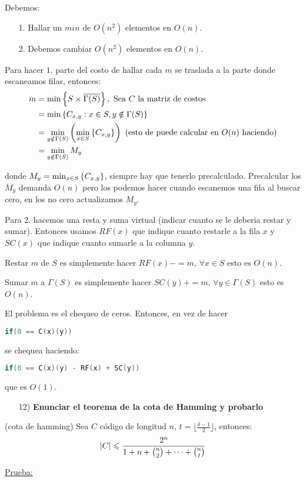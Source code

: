 \documentclass[12pt,a4paper]{article}
\begin{document}
Debemos:
\begin{itemize}
    \item [1.] Hallar un $min$ de $O(n^{2})$ elementos en $O(n)$.
    \item [2.] Debemos cambiar $O(n^{2})$ elementos en $O(n)$.
\end{itemize}

Para hacer $1.$ parte del costo de hallar cada $m$ se traslada a la parte donde 
escaneamos filas, entonces:
\begin{align*}
    m &= \min \left\lbrace S \times \overline{\Gamma(S)} \right\rbrace,\,\, \text{Sea $C$ la matriz de costos} \\
    &= \min \left\lbrace C_{x,y} : x \in S, y \notin \Gamma(S) \right\rbrace \\
    &= \min_{y\notin \Gamma(S)} \left(\min_{x\in S}\left\lbrace C_{x,y} \right\rbrace\right)\,\,(\text{esto de puede calcular en $O(n)$ haciendo})\\
    &= \min_{y \notin \Gamma(S)} M_{y} 
\end{align*}

donde $M_{y} = \min_{x\in S}\left\lbrace C_{x,y} \right\rbrace$, siempre hay que tenerlo precalculado. Precalcular 
los $M_{y}$ demanda $O(n)$ pero los podemos hacer cuando escanemos una fila al 
buscar cero, en los no cero actualizamos $M_{y}$.
\medskip

Para $2.$ hacemos una resta y suma virtual (indicar cuanto se le deberia restar y sumar). 
Entonces usamos $RF(x)$ que indique cuanto restarle a la fila $x$ y $SC(x)$ que indique 
cuanto sumarle a la columna $y$.
\medskip

Restar $m$ de $S$ es simplemente hacer $RF(x) -= m,\, \forall x\in S$ esto es $O(n)$.

Sumar $m$ a $\Gamma(S)$ es simplemente hacer $SC(y) += m,\, \forall y\in \Gamma(S)$ esto es $O(n)$.
\medskip

El problema es el chequeo de ceros. Entonces, en vez de hacer
\begin{lstlisting}[language=C]
    if(0 == C(x)(y))
\end{lstlisting}

se chequea haciendo:
\begin{lstlisting}[language=C]
    if(0 == C(x)(y) - RF(x) + SC(y))
\end{lstlisting}
que es $O(1)$.

\begin{itemize}
    \item [12)] \textbf{Enunciar el teorema de la cota de Hamming y probarlo}
    \label{dem:hamming}
\end{itemize}
\begin{teorema} (cota de hamming) Sea $C$ código de longitud $n$, $t = \lfloor \frac{\delta -1}{2} \rfloor$, entonces:
    $$|C| \leqslant \frac{2^{n}}{1+n+ \binom{n}{2} + \cdots + \binom{n}{t}}$$
\end{teorema}
\underline{Prueba:}
\end{document}
